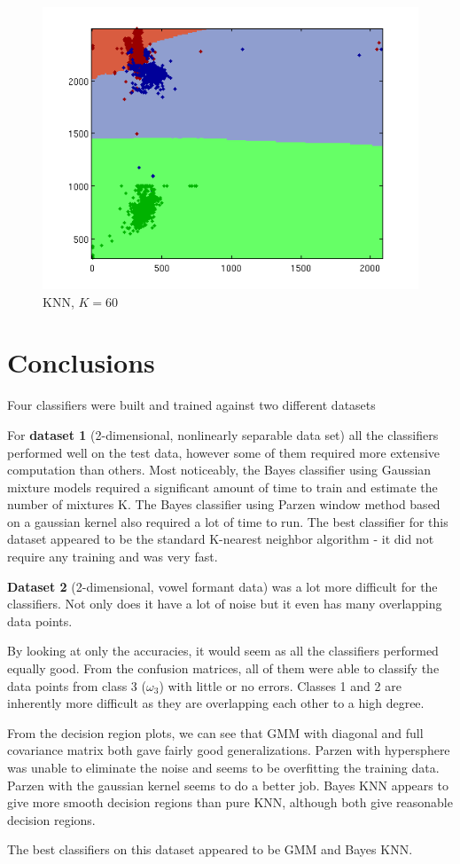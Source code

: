 \documentclass[a4paper]{article}
\begin{document}
\begin{figure}[htbp!]
\center
\includegraphics[clip, trim=40px 15px 30px 10px]{knn_real.png}
\caption{KNN, $K=60$}
\end{figure}


\section{Conclusions}

Four classifiers were built and trained against two different datasets

For \textbf{dataset 1} (2-dimensional, nonlinearly separable data set) all the
classifiers performed well on the test data, however some of them required
more extensive computation than others. Most noticeably, the Bayes classifier
using Gaussian mixture models required a significant amount of time to
train and estimate the number of mixtures K. The Bayes classifier using
Parzen window method based on a gaussian kernel also required a lot of
time to run. The best classifier for this dataset appeared to be the standard
K-nearest neighbor algorithm - it did not require any training and was
very fast.


\textbf{Dataset 2} (2-dimensional, vowel formant data) was a lot more
difficult for the classifiers. Not only does it have a lot of noise
but it even has many overlapping data points.

By looking at only the accuracies, it would seem as all the classifiers
performed equally good. From the confusion matrices, all of them were
able to classify the data points from class 3 ($\omega_3$) with little
or no errors. Classes 1 and 2 are inherently more difficult as they are
overlapping each other to a high degree.

From the decision region plots, we can see that GMM with diagonal
and full covariance matrix both gave fairly good generalizations.
Parzen with hypersphere was unable to eliminate the noise and seems
to be overfitting the training data. Parzen with the gaussian kernel
seems to do a better job. Bayes KNN appears to give more smooth decision
regions than pure KNN, although both give reasonable decision regions.

The best classifiers on this dataset appeared to be GMM and Bayes KNN.
\end{document}
